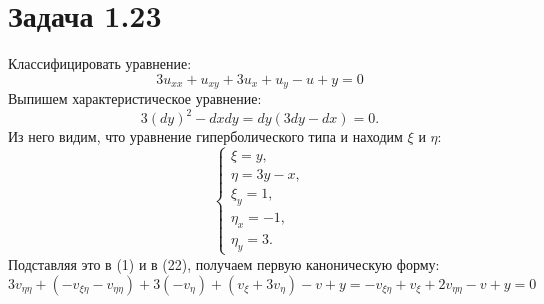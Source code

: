 \documentclass[11pt]{article}
\begin{document}
\section{Задача 1.23}
\label{sec:org4d33c78}
Классифицировать уравнение:
\begin{equation}
3u_{xx} + u_{xy} + 3u_x + u_y - u + y = 0
\end{equation}
Выпишем характеристическое уравнение:
\begin{equation}
3(dy)^2 - dxdy = dy(3dy - dx) = 0.
\end{equation}
Из него видим, что уравнение гиперболического типа и находим $\xi$ и $\eta$:
\begin{equation}
\begin{cases}
\xi = y, \\
\eta = 3y - x, \\
\xi_y = 1, \\
\eta_x = -1, \\
\eta_y = 3.
\end{cases}
\end{equation}
Подставляя это в (1) и в (22), получаем первую каноническую форму:
\begin{equation}
3v_{\eta\eta} + (-v_{\xi\eta} - v_{\eta\eta}) + 3(-v_{\eta}) + (v_{\xi} + 3v_{\eta}) - v + y =
-v_{\xi\eta} + v_{\xi} + 2v_{\eta\eta} - v + y = 0
\end{equation}
\end{document}

